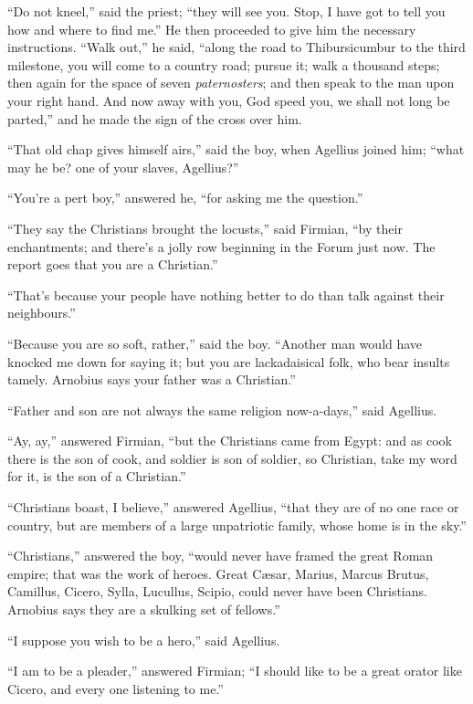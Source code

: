 ``Do not kneel,'' said the priest; ``they will see you.
Stop, I have got to tell you how and where to find me.'' He then
proceeded to give him the necessary instructions. ``Walk
out,'' he said, ``along the road to Thibursicumbur to the
third milestone, you will come to a country road; pursue it;
walk a thousand steps; then again for the space of seven \emph{paternosters};
and then speak to the man upon your right hand. And now away with you,
God speed you, we shall not long be parted,'' and he made the sign
of the cross over him.

``That old chap gives himself airs,'' said the boy, when
Agellius joined him; ``what may he be? one of your slaves,
Agellius?''

``You're a pert boy,'' answered he, ``for asking me the
question.''

``They say the Christians brought the locusts,'' said
Firmian, ``by their enchantments; and there's a jolly row
beginning in the Forum just now. The report goes that you are a
Christian.''

``That's because your people have nothing better to do than
talk against their neighbours.''

``Because you are so soft, rather,'' said the boy.
``Another man would have knocked me down for saying it; but you
are lackadaisical folk, who bear insults tamely. Arnobius says your
father was a Christian.''

``Father and son are not always the same religion
now-a-days,'' said Agellius.

``Ay, ay,'' answered Firmian, ``but the Christians came
from Egypt: and as cook there is the son of cook, and soldier is son
of soldier, so Christian, take my word for it, is the son of a
Christian.''

``Christians boast, I believe,'' answered Agellius,
``that they are of no one race or country, but are members
of a large unpatriotic family, whose home is in the sky.''

``Christians,'' answered the boy, ``would never have
framed the great Roman empire; that was the work of heroes. Great
Cæsar, Marius, Marcus Brutus, Camillus, Cicero, Sylla, Lucullus,
Scipio, could never have been Christians. Arnobius says they are a
skulking set of fellows.''

``I suppose you wish to be a hero,'' said Agellius.

``I am to be a pleader,'' answered Firmian; ``I should
like to be a great orator like Cicero, and every one listening to
me.''


